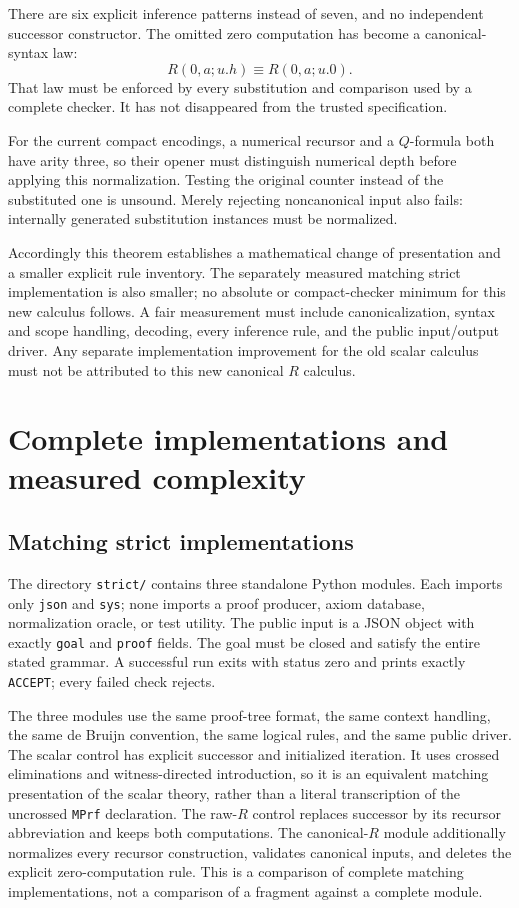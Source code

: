 \documentclass[11pt]{article}
\theoremstyle{definition}
\newcommand{\file}[1]{{\small\nolinkurl{#1}}}
\begin{document}
There are six explicit inference patterns instead of seven, and no independent successor constructor. The omitted zero computation has become a canonical-syntax law:
\[
R(0,a;u.h)\equiv R(0,a;u.0).
\]
That law must be enforced by every substitution and comparison used by a complete checker. It has not disappeared from the trusted specification.

For the current compact encodings, a numerical recursor and a \(Q\)-formula both have arity three, so their opener must distinguish numerical depth before applying this normalization. Testing the original counter instead of the substituted one is unsound. Merely rejecting noncanonical input also fails: internally generated substitution instances must be normalized.

Accordingly this theorem establishes a mathematical change of presentation and a smaller explicit rule inventory. The separately measured matching strict implementation is also smaller; no absolute or compact-checker minimum for this new calculus follows. A fair measurement must include canonicalization, syntax and scope handling, decoding, every inference rule, and the public input/output driver. Any separate implementation improvement for the old scalar calculus must not be attributed to this new canonical \(R\) calculus.



\section{Complete implementations and measured complexity}
\label{sec:implementation}

\subsection{Matching strict implementations}

The directory \file{strict/} contains three standalone Python modules.
Each imports only \texttt{json} and \texttt{sys}; none imports a proof
producer, axiom database, normalization oracle, or test utility. The public
input is a JSON object with exactly \texttt{goal} and \texttt{proof} fields.
The goal must be closed and satisfy the entire stated grammar. A successful
run exits with status zero and prints exactly \texttt{ACCEPT}; every failed
check rejects.

The three modules use the same proof-tree format, the same context handling,
the same de Bruijn convention, the same logical rules, and the same public
driver. The scalar control has explicit successor and initialized iteration.
It uses crossed eliminations and witness-directed introduction, so it is an
equivalent matching presentation of the scalar theory, rather than a literal
transcription of the uncrossed \texttt{MPrf} declaration.
The raw-$R$ control replaces successor by its recursor abbreviation and keeps
both computations. The canonical-$R$ module additionally normalizes every
recursor construction, validates canonical inputs, and deletes the explicit
zero-computation rule. This is a comparison of complete matching
implementations, not a comparison of a fragment against a complete module.
\end{document}
